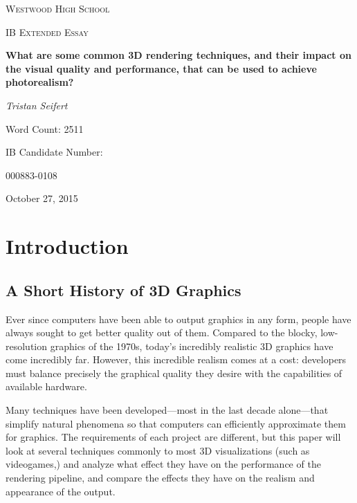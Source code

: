 \documentclass[11pt, oneside]{report}
\begin{document}
\begin{titlepage}
	\centering
	{\scshape\LARGE Westwood High School \par}
	\vspace{0.66cm}
	{\scshape\Large IB Extended Essay\par}
	\vspace{1.5cm}
	{\huge\bfseries What are some common 3D rendering techniques, and their impact on the visual quality and performance, that can be used to achieve photorealism?\par}
	\vspace{1.5cm}
	{\Large\itshape Tristan Seifert\par}
	\vspace{0.33cm}
	{\large Word Count: 2511\par}
	\vfill
	
	IB Candidate Number:\par
	000883-0108

	\vfill

	{\large October 27, 2015 \par}
\end{titlepage}

\tableofcontents

\chapter{Introduction}
\section{A Short History of 3D Graphics}
Ever since computers have been able to output graphics in any form, people have always sought to get better quality out of them. Compared to the blocky, low-resolution graphics of the 1970s, today’s incredibly realistic 3D graphics have come incredibly far. However, this incredible realism comes at a cost: developers must balance precisely the graphical quality they desire with the capabilities of available hardware.

Many techniques have been developed—most in the last decade alone—that simplify natural phenomena so that computers can efficiently approximate them for graphics. The requirements of each project are different, but this paper will look at several techniques commonly to most 3D visualizations (such as videogames,) and analyze what effect they have on the performance of the rendering pipeline, and compare the effects they have on the realism and appearance of the output.
\end{document}
